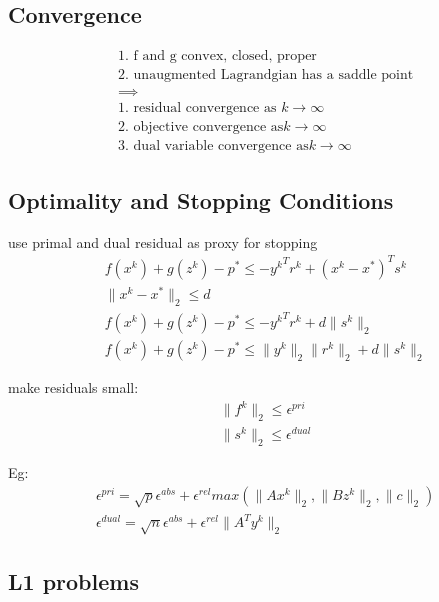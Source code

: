 \documentclass[8pt]{report}
\newcommand{\norm}[1]{\|#1\|}
\begin{document}
\begin{multicols*}{2}
  \vfill\null
  \columnbreak
  
  \subsection{Convergence}
  \begin{align*}
    &\text{1. f and g convex, closed, proper}\\
    &\text{2. unaugmented Lagrandgian has a saddle point}\\
    &\implies\\
    &\text{1. residual convergence as }k \rightarrow \infty\\
    &\text{2. objective convergence as}k \rightarrow \infty\\
    &\text{3. dual variable convergence as}k \rightarrow \infty
  \end{align*}
  
\subsection{Optimality and Stopping Conditions}
  use primal and dual residual as proxy for stopping\\
  \begin{align*}
    &f(x^k)+g(z^k)-p^* \leq -{y^k}^T r^k + (x^k-x^*)^T s^k\\
    &\norm{x^k-x^*}_2 \leq d\\
    &f(x^k)+g(z^k)-p^* \leq -{y^k}^T r^k + d \norm{s^k}_2\\
    &f(x^k)+g(z^k)-p^* \leq \norm{y^k}_2 \norm{r^k}_2 + d \norm{s^k}_2
  \end{align*}

  make residuals small:
  \begin{align*}
    &\norm{f^k}_2 \leq \epsilon^{pri}\\
    &\norm{s^k}_2 \leq \epsilon^{dual}
  \end{align*}

  Eg:
  \begin{align*}
    &\epsilon^{pri}=\sqrt{p} \epsilon^{abs} + \epsilon^{rel} max(\norm{Ax^k}_2, \norm{Bz^k}_2, \norm{c}_2)\\
    &\epsilon^{dual}=\sqrt{n} \epsilon^{abs} + \epsilon^{rel} \norm{A^T y^k}_2
  \end{align*}
    
  \vfill\null
  \columnbreak

  \subsection{L1 problems}
  

\end{multicols*}
\end{document}
